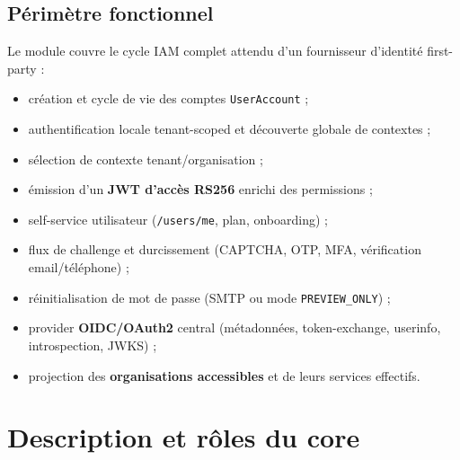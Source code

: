 \documentclass[11pt,a4paper,oneside]{report}
\newcommand{\code}[1]{\texttt{\small #1}}
\begin{document}
\section{Périmètre fonctionnel}
Le module couvre le cycle IAM complet attendu d'un fournisseur d'identité first-party :
\begin{itemize}[leftmargin=1.4em,itemsep=1pt]
  \item création et cycle de vie des comptes \code{UserAccount} ;
  \item authentification locale tenant-scoped et découverte globale de contextes ;
  \item sélection de contexte tenant/organisation ;
  \item émission d'un \textbf{JWT d'accès RS256} enrichi des permissions ;
  \item self-service utilisateur (\code{/users/me}, plan, onboarding) ;
  \item flux de challenge et durcissement (CAPTCHA, OTP, MFA, vérification email/téléphone) ;
  \item réinitialisation de mot de passe (SMTP ou mode \code{PREVIEW\_ONLY}) ;
  \item provider \textbf{OIDC/OAuth2} central (métadonnées, token-exchange, userinfo, introspection, JWKS) ;
  \item projection des \textbf{organisations accessibles} et de leurs services effectifs.
\end{itemize}

\chapter{Description et rôles du core}
\end{document}
